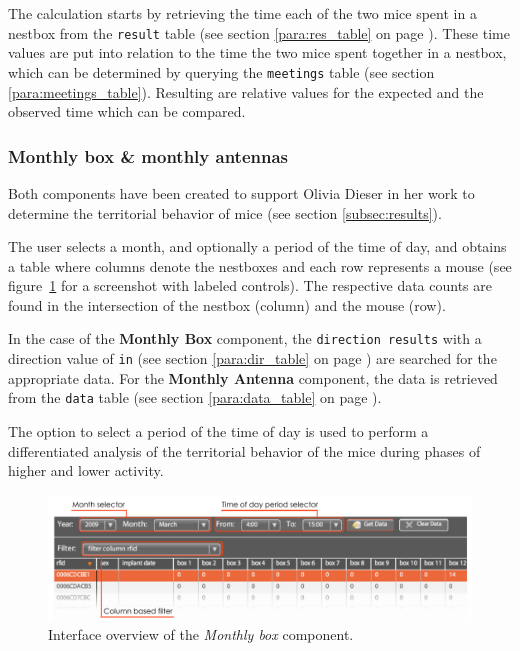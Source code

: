 The calculation starts by retrieving the time each of the two mice spent in a nestbox from the \lstinline|result| table (see section \ref{para:res_table} on page \pageref{para:res_table}). These time values are put into relation to the time the two mice spent together in a nestbox, which can be determined by querying the \lstinline|meetings| table (see section \ref{para:meetings_table}). Resulting are relative values for the expected and the observed time which can be compared. 

\subsubsection{Monthly box \& monthly antennas}
\label{subsubsec:monthbox}

Both components have been created to support Olivia Dieser in her work to determine the territorial behavior of mice (see section \ref{subsec:results}).

The user selects a month, and optionally a period of the time of day, and obtains a table where columns denote the nestboxes and each row represents a mouse (see figure~\ref{fig:month_box_ant} for a screenshot with labeled controls). The respective data counts are found in the intersection of the nestbox (column) and the mouse (row).

In the case of the \textbf{Monthly Box} component, the \lstinline|direction results| with a direction value of \lstinline|in| (see section \ref{para:dir_table} on page \pageref{para:dir_table}) are searched for the appropriate data. For the \textbf{Monthly Antenna} component, the data is retrieved from the \lstinline|data| table (see section \ref{para:data_table} on page \pageref{para:data_table}).

The option to select a period of the time of day is used to perform a differentiated analysis of the territorial behavior of the mice during phases of higher and lower activity.

\begin{figure}[htpb]
\begin{center}
  \includegraphics[width=\textwidth]{assets/pdf/month_box_ant.pdf}
  \caption[\textit{Monthly box} component interface overview]{Interface overview of the \textit{Monthly box} component.}
  \label{fig:month_box_ant}
\end{center}
\end{figure}

